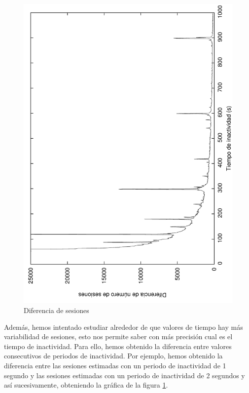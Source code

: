 \documentclass[twocolumn]{Jornadas}
\begin{document}
\begin{figure}[]
\begin{center}
  \includegraphics[scale=0.30,angle=-90]{figures/diffInactivitiPeriod_full.pdf}
\end{center}
\caption{Diferencia de sesiones} \label{fig:diffSessions}
\end{figure}

Además, hemos intentado estudiar alrededor de que valores de tiempo hay más variabilidad de sesiones, esto nos permite saber con más precisión cual es el tiempo de inactividad. Para ello, hemos obtenido la diferencia entre valores consecutivos de periodos de inactividad. Por ejemplo, hemos obtenido la diferencia entre las sesiones estimadas con un periodo de inactividad de 1 segundo y las sesiones estimadas con un periodo de inactividad de 2 segundos y así sucesivamente, obteniendo la gráfica de la figura \ref{fig:diffSessions}.
\end{document}
